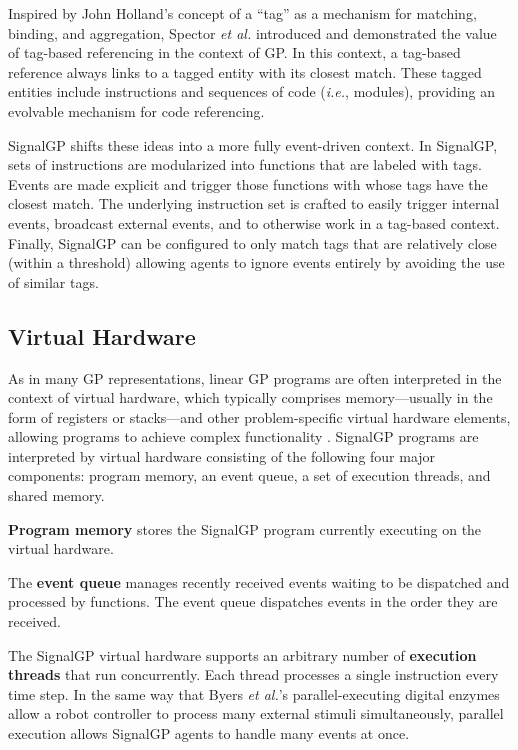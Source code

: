 Inspired by John Holland's concept of a ``tag'' \citep{holland_effect_1993,holland_genetic_1987,holland_concerning_1990,holland_studying_2006} as a mechanism for matching, binding, and aggregation, Spector \textit{et al.} \citep{spector_tag-based_2011,spector_whats_2011,spector_tag-based_2012} introduced and demonstrated the value of tag-based referencing in the context of GP. 
In this context, a tag-based reference always links to a tagged entity with its closest match. 
These tagged entities include instructions and sequences of code (\textit{i.e.}, modules), providing an evolvable mechanism for code referencing. 

SignalGP shifts these ideas into a more fully event-driven context.
In SignalGP, sets of instructions are modularized into functions that are labeled with tags. Events are made explicit and trigger those functions with whose tags have the closest match.
The underlying instruction set is crafted to easily trigger internal events, broadcast external events, and to otherwise work in a tag-based context. 
Finally, SignalGP can be configured to only match tags that are relatively close (within a threshold) allowing agents to ignore events entirely by avoiding the use of similar tags.

\subsection{Virtual Hardware} 

As in many GP representations, linear GP programs are often interpreted in the context of virtual hardware, which typically comprises memory---usually in the form of registers or stacks---and other problem-specific virtual hardware elements, allowing programs to achieve complex functionality \citep{mcdermott_genetic_2015,poli_field_2008,ofria_avida:_2009}. 
SignalGP programs are interpreted by virtual hardware consisting of the following four major components: program memory, an event queue, a set of execution threads, and shared memory.

\textbf{Program memory} stores the SignalGP program currently executing on the virtual hardware.

The \textbf{event queue} manages recently received events waiting to be dispatched and processed by functions. The event queue dispatches events in the order they are received. 

The SignalGP virtual hardware supports an arbitrary number of \textbf{execution threads} that run concurrently. 
Each thread processes a single instruction every time step. 
In the same way that Byers \textit{et al.}'s parallel-executing digital enzymes \citep{byers_digital_2011} allow a robot controller to process many external stimuli simultaneously, parallel execution allows SignalGP agents to handle many events at once.

